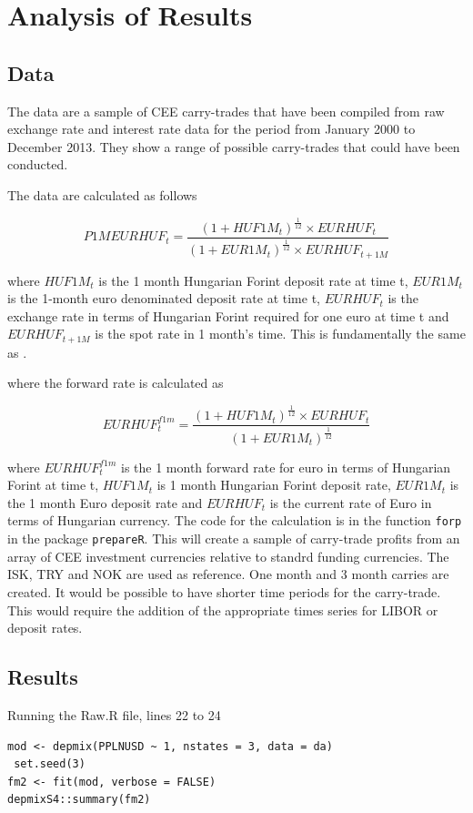\documentclass[12pt, a4paper, oneside]{article} %
\begin{document}
\section{Analysis of Results}
\subsection{Data}
The data are a sample of CEE carry-trades that have been compiled from raw exchange rate and interest rate data for the period from January 2000 to December 2013.  They show a range of possible carry-trades that could have been conducted. 

The data are calculated as follows

\begin{equation}\label{eqref:carryprofit}
P1MEURHUF_t = \frac{(1 + HUF1M_t)^{\frac{1}{12}} \times EURHUF_t }{(1 + EUR1M_t)^{\frac{1}{12}} \times EURHUF_{t+1M}}
\end{equation}

where $HUF1M_t$ is the 1 month Hungarian Forint deposit rate at time t, $EUR1M_t$ is the 1-month euro denominated deposit rate at time t, $EURHUF_t$ is the exchange rate in terms of  Hungarian Forint required for one euro at time t and  $EURHUF_{t+1M}$ is the spot rate in 1 month's time.  This is fundamentally the same as \citep{BrunnermeierCarry}.

where the forward rate is calculated as

\begin{equation}\label{eqref:forward}
EURHUF_t^{f1m} = \frac{(1 + HUF1M_t)^{\frac{1}{12}} \times EURHUF_t }{(1 + EUR1M_t)^{\frac{1}{12}}}
\end{equation}

where  $EURHUF_t^{f1m}$ is the 1 month forward rate for euro in terms of Hungarian Forint at time t, $HUF1M_t$ is 1 month Hungarian Forint deposit rate, $EUR1M_t$ is the 1 month Euro deposit rate and $EURHUF_t$ is the current rate of Euro in terms of Hungarian currency.  The code for the calculation is in the function \lstinline{forp} in the package \lstinline{prepareR}. This will create a sample of carry-trade profits from an array of CEE investment currencies relative to standrd funding currencies.   The ISK, TRY and NOK are used as reference.  One month and 3 month carries are created.  It would be possible to have shorter time periods for the carry-trade.   This would require the addition of the appropriate times series for LIBOR or deposit rates.  

\subsection{Results}
Running the Raw.R file, lines 22 to 24
\begin{lstlisting}
mod <- depmix(PPLNUSD ~ 1, nstates = 3, data = da)
 set.seed(3)
fm2 <- fit(mod, verbose = FALSE)
depmixS4::summary(fm2)
\end{lstlisting}
\end{document}
